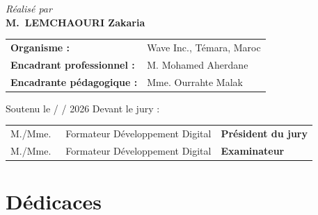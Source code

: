 \documentclass[12pt, a4paper]{report}
\begin{document}
\begin{titlepage}
\vspace{0.8cm}

{\large\itshape Réalisé par}\\[0.3cm]
{\LARGE\bfseries\color{WaveDark}M.\ LEMCHAOURI Zakaria}

\vspace{0.8cm}

\begin{tabular}{@{}ll@{}}
  \textbf{Organisme :}                 & Wave Inc., Témara, Maroc \\[4pt]
  \textbf{Encadrant professionnel :}   & M. Mohamed Aherdane \\[4pt]
  \textbf{Encadrante pédagogique :}    & Mme. Ourrahte Malak \\
\end{tabular}

\vfill

{\normalsize Soutenu le \underline{\hspace{2cm}} /\underline{\hspace{2cm}} / 2026 \quad Devant le jury :}\\[0.5cm]
\begin{tabular}{@{}lll@{}}
  M./Mme.\ \underline{\hspace{3.8cm}} & Formateur Développement Digital & \textbf{Président du jury}\\[4pt]
  M./Mme.\ \underline{\hspace{3.8cm}} & Formateur Développement Digital & \textbf{Examinateur}\\
\end{tabular}


\end{titlepage}

\cleardoublepage

\chapter*{Dédicaces}
\end{document}
